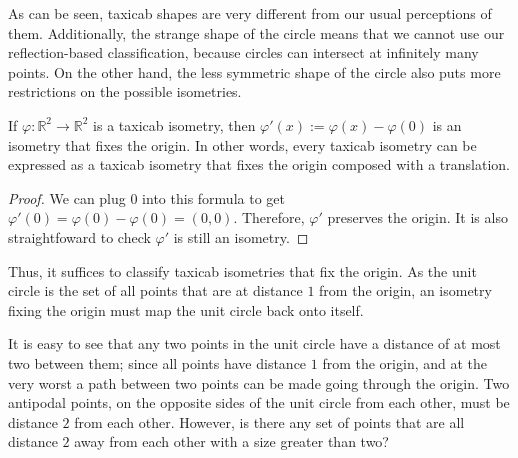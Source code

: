 \documentclass{mystyle}
\begin{document}
As can be seen, taxicab shapes are very different from our usual perceptions of them. Additionally, the strange shape of the circle means that we cannot use our reflection-based classification, because circles can intersect at infinitely many points. On the other hand, the less symmetric shape of the circle also puts more restrictions on the possible isometries. 


\begin{lemma}\label{lem_translation}
    If $\varphi: \mathbb{R}^2 \to \mathbb{R}^2$ is a taxicab isometry, then $\varphi'(x):= \varphi(x) - \varphi(0)$ is an isometry that fixes the origin. In other words, every taxicab isometry can be expressed as a taxicab isometry that fixes the origin composed with a translation.
\end{lemma}
\begin{proof}
    We can plug $0$ into this formula to get $\varphi'(0)= \varphi(0) - \varphi(0) = (0,0)$. Therefore, $\varphi'$ preserves the origin. It is also straightfoward to check $\varphi'$ is still an isometry. 
\end{proof}

Thus, it suffices to classify taxicab isometries that fix the origin. As the unit circle is the set of all points that are at distance $1$ from the origin, an isometry fixing the origin must map the unit circle back onto itself. 

It is easy to see that any two points in the unit circle have a distance of at most two between them; since all points have distance $1$ from the origin, and at the very worst a path between two points can be made going through the origin. Two antipodal points, on the opposite sides of the unit circle from each other, must be distance $2$ from each other. However, is there any set of points that are all distance $2$ away from each other with a size greater than two?
\end{document}
